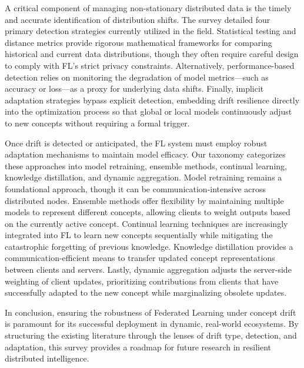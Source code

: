 \documentclass[journal]{IEEEtran}
\begin{document}
A critical component of managing non-stationary distributed data is the timely and accurate identification of distribution shifts. The survey detailed four primary detection strategies currently utilized in the field. Statistical testing and distance metrics provide rigorous mathematical frameworks for comparing historical and current data distributions, though they often require careful design to comply with FL's strict privacy constraints. Alternatively, performance-based detection relies on monitoring the degradation of model metrics—such as accuracy or loss—as a proxy for underlying data shifts. Finally, implicit adaptation strategies bypass explicit detection, embedding drift resilience directly into the optimization process so that global or local models continuously adjust to new concepts without requiring a formal trigger.

Once drift is detected or anticipated, the FL system must employ robust adaptation mechanisms to maintain model efficacy. Our taxonomy categorizes these approaches into model retraining, ensemble methods, continual learning, knowledge distillation, and dynamic aggregation. Model retraining remains a foundational approach, though it can be communication-intensive across distributed nodes. Ensemble methods offer flexibility by maintaining multiple models to represent different concepts, allowing clients to weight outputs based on the currently active concept. Continual learning techniques are increasingly integrated into FL to learn new concepts sequentially while mitigating the catastrophic forgetting of previous knowledge. Knowledge distillation provides a communication-efficient means to transfer updated concept representations between clients and servers. Lastly, dynamic aggregation adjusts the server-side weighting of client updates, prioritizing contributions from clients that have successfully adapted to the new concept while marginalizing obsolete updates.

In conclusion, ensuring the robustness of Federated Learning under concept drift is paramount for its successful deployment in dynamic, real-world ecosystems. By structuring the existing literature through the lenses of drift type, detection, and adaptation, this survey provides a roadmap for future research in resilient distributed intelligence.



\end{document}
